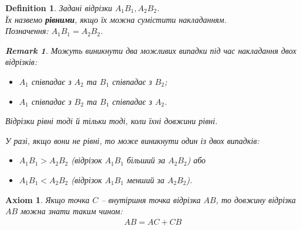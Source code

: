 \documentclass[a4paper, 10pt]{article}
\theoremstyle{theoremdd}
\theoremstyle{theoremdd}
\newtheorem{axiom}{Axiom}
\theoremstyle{theoremdd}
\newtheorem{definition}[theorem]{Definition}
\theoremstyle{theoremdd}
\theoremstyle{theoremdd}
\theoremstyle{theoremdd}
\theoremstyle{theoremdd}
\newtheorem{remark}[theorem]{Remark}
\theoremstyle{theoremdd}
\theoremstyle{theoremdd}
\begin{document}
\begin{definition}
Задані відрізки $A_1B_1, A_2B_2$.\\
Їх назвемо \textbf{рівними}, якщо їх можна сумістити накладанням.\\
Позначення: $A_1B_1 = A_2B_2$.
\begin{figure}[H]
\centering
{}
\end{figure}

\begin{remark}
Можуть виникнути два можливих випадки під час накладання двох відрізків:
\begin{itemize}[nosep,wide=0pt]
\item $A_1$ співпадає з $A_2$ та $B_1$ співпадає з $B_2$;
\item $A_1$ співпадає з $B_2$ та $B_1$ співпадає з $A_2$.
\end{itemize}
\end{remark}

Відрізки рівні тоді й тільки тоді, коли їхні довжини рівні.

У разі, якщо вони не рівні, то може виникнути один із двох випадків:
\begin{itemize}[nosep,wide=0pt]
\item $A_1B_1 > A_2B_2$ (відрізок $A_1B_1$ більший за $A_2B_2$) або
\item $A_1B_1 < A_2B_2$ (відрізок $A_1B_1$ менший за $A_2B_2$).
\end{itemize}
\end{definition}

\begin{axiom}
Якщо точка $C$ -- внутіршня точка відрізка $AB$, то довжину відрізка $AB$ можна знати таким чином:
\begin{align*}
AB = AC + CB
\end{align*}
\begin{figure}[H]
\centering
{}
\end{figure}
\end{axiom}
\end{document}
